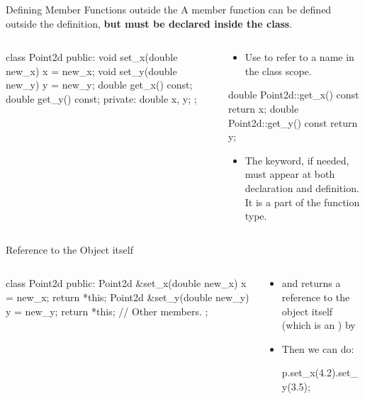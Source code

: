 \documentclass{beamer}
\begin{document}
\begin{frame}[fragile]{Defining Member Functions outside the \class}
    A member function can be defined outside the \class definition, \textbf{but must be declared inside the class}.
    \begin{columns}
        \begin{column}{0.5\linewidth}
            \begin{cpp}
class Point2d {
 public:
  void set_x(double new_x) {
    x = new_x;
  }
  void set_y(double new_y) {
    y = new_y;
  }
  double get_x() const;
  double get_y() const;
 private:
  double x, y;
};
            \end{cpp}        
        \end{column}
        \begin{column}{0.5\linewidth}
            \begin{itemize}
                \item Use  to refer to a name in the class scope.
            \end{itemize}
            \begin{cpp}
double Point2d::get_x() const {
  return x;
}
double Point2d::get_y() const {
  return y;
}
            \end{cpp}
            \begin{itemize}
                \item The \const keyword, if needed, must appear at both declaration and definition. It is a part of the function type.
            \end{itemize}
        \end{column}
    \end{columns}
\end{frame}

\begin{frame}[fragile]{Reference to the Object itself}
    \begin{columns}
        \begin{column}{0.5\linewidth}
            \begin{cpp}
class Point2d {
 public:
  Point2d &set_x(double new_x) {
    x = new_x;
    return *this;
  }
  Point2d &set_y(double new_y) {
    y = new_y;
    return *this;
  }
  // Other members.
};
            \end{cpp}        
        \end{column}
        \begin{column}{0.5\linewidth}
            \begin{itemize}
                \item {} and  returns a reference to the object itself (which is an ) by 
                \item Then we can do:
                \begin{cpp}
p.set_x(4.2).set_y(3.5);
                \end{cpp}
            \end{itemize}
        \end{column}
    \end{columns}
\end{frame}
\end{document}

